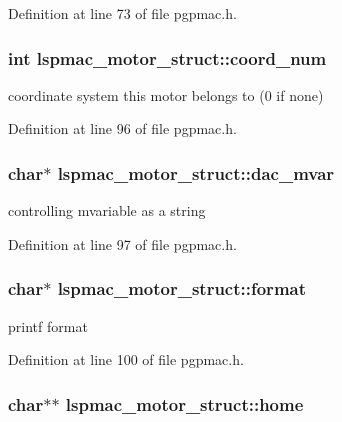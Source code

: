 Definition at line 73 of file pgpmac.h.\hypertarget{structlspmac__motor__struct_a2093b0a3cd2f9500fd92e3c89bf46577}{
\subsubsection[{coord\_\-num}]{\setlength{\rightskip}{0pt plus 5cm}int {\bf lspmac\_\-motor\_\-struct::coord\_\-num}}}
\label{structlspmac__motor__struct_a2093b0a3cd2f9500fd92e3c89bf46577}


coordinate system this motor belongs to (0 if none) 

Definition at line 96 of file pgpmac.h.\hypertarget{structlspmac__motor__struct_a05dff021221abbc1bf656039fffb3275}{
\subsubsection[{dac\_\-mvar}]{\setlength{\rightskip}{0pt plus 5cm}char$\ast$ {\bf lspmac\_\-motor\_\-struct::dac\_\-mvar}}}
\label{structlspmac__motor__struct_a05dff021221abbc1bf656039fffb3275}


controlling mvariable as a string 

Definition at line 97 of file pgpmac.h.\hypertarget{structlspmac__motor__struct_aba3d9d00271187128506bbbb1d77da19}{
\subsubsection[{format}]{\setlength{\rightskip}{0pt plus 5cm}char$\ast$ {\bf lspmac\_\-motor\_\-struct::format}}}
\label{structlspmac__motor__struct_aba3d9d00271187128506bbbb1d77da19}


printf format 

Definition at line 100 of file pgpmac.h.\hypertarget{structlspmac__motor__struct_a073246b8878d75615b0536301b343f3d}{
\subsubsection[{home}]{\setlength{\rightskip}{0pt plus 5cm}char$\ast$$\ast$ {\bf lspmac\_\-motor\_\-struct::home}}}
\label{structlspmac__motor__struct_a073246b8878d75615b0536301b343f3d}



